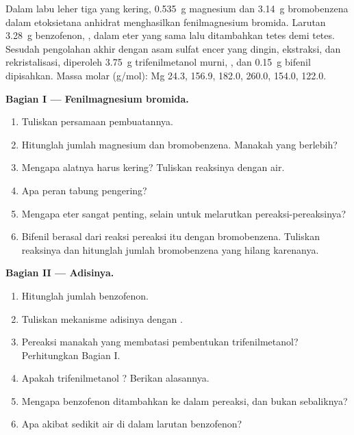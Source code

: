 \begin{problem}
\label{pb:b1:organomagnesium:1}
Dalam labu leher tiga yang kering, \qty{0.535}{g} magnesium dan
\qty{3.14}{g} bromobenzena dalam etoksietana anhidrat menghasilkan
fenilmagnesium bromida. Larutan \qty{3.28}{g} benzofenon,
, dalam eter yang sama lalu ditambahkan tetes demi tetes.
Sesudah pengolahan akhir dengan asam sulfat encer yang dingin, ekstraksi,
dan rekristalisasi, diperoleh \qty{3.75}{g} trifenilmetanol murni,
, dan \qty{0.15}{g} bifenil dipisahkan. Massa molar
(\unit{g/mol}): Mg 24.3,  156.9,  182.0,
 260.0,  154.0,  122.0.

\medskip
\noindent\textbf{Bagian I --- Fenilmagnesium bromida.}
\begin{enumerate}
  \item Tuliskan persamaan pembuatannya.
  \item Hitunglah jumlah magnesium dan bromobenzena. Manakah yang
        berlebih?
  \item Mengapa alatnya harus kering? Tuliskan reaksinya dengan air.
  \item Apa peran tabung pengering?
  \item Mengapa eter sangat penting, selain untuk melarutkan
        pereaksi-pereaksinya?
  \item Bifenil berasal dari reaksi pereaksi itu dengan bromobenzena.
        Tuliskan reaksinya dan hitunglah jumlah bromobenzena yang hilang
        karenanya.
\end{enumerate}

\medskip
\noindent\textbf{Bagian II --- Adisinya.}
\begin{enumerate}[resume]
  \item Hitunglah jumlah benzofenon.
  \item Tuliskan mekanisme adisinya dengan .
  \item Pereaksi manakah yang membatasi pembentukan trifenilmetanol?
        Perhitungkan Bagian I.
  \item Apakah trifenilmetanol ? Berikan alasannya.
  \item Mengapa benzofenon ditambahkan ke dalam pereaksi, dan bukan
        sebaliknya?
  \item Apa akibat sedikit air di dalam larutan benzofenon?
\end{enumerate}


\end{problem}
